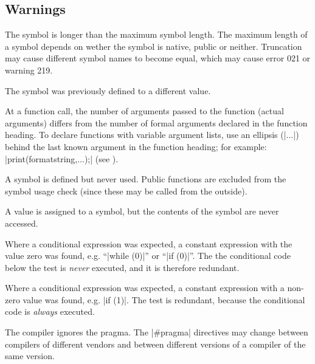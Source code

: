 {{\subsection{Warnings}

\beginlist{40pt}
 
        The symbol is longer than the maximum symbol length. The maximum length
        of a symbol depends on wether the symbol is native, public or neither.
        Truncation may cause different symbol names to become equal, which may
        cause error 021 or warning 219.

 
        The symbol was previously defined to a different value.

 
        At a function call, the number of arguments passed to the function
        (actual arguments) differs from the number of formal arguments
        declared in the function heading. To declare functions with variable
        argument lists, use an ellipsis (|...|) behind the last known argument
        in the function heading; for example: |print(formatstring,...);|
        (see ).

 
        A symbol is defined but never used. Public functions are excluded
        from the symbol usage check (since these may be called from the
        outside).

 
        A value is assigned to a symbol, but the contents of the symbol are
        never accessed.

 
        Where a conditional expression was expected, a constant expression
        with the value zero was found, e.g. ``|while (0)|'' or ``|if (0)|''. The
        the conditional code below the test is {\it never\/} executed, and it
        is therefore redundant.

 
        Where a conditional expression was expected, a constant expression
        with a non-zero value was found, e.g. |if (1)|. The test is redundant,
        because the conditional code is {\it always\/} executed.

 
        The compiler ignores the pragma. The |#pragma| directives may change
        between compilers of different vendors and between different versions
        of a compiler of the same version.

}}
